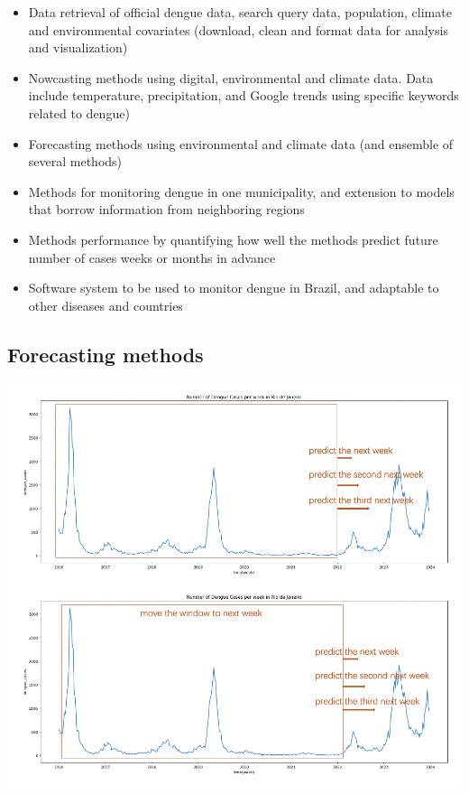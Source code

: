 \documentclass[
  letterpaper,
  DIV=11,
  numbers=noendperiod]{scrreprt}
\providecommand{\tightlist}{%
  \setlength{\itemsep}{0pt}\setlength{\parskip}{0pt}}\usepackage{longtable,booktabs,array}
\begin{document}
\begin{itemize}
\tightlist
\item
  Data retrieval of official dengue data, search query data, population,
  climate and environmental covariates (download, clean and format data
  for analysis and visualization)
\item
  Nowcasting methods using digital, environmental and climate data. Data
  include temperature, precipitation, and Google trends using specific
  keywords related to dengue)
\item
  Forecasting methods using environmental and climate data (and ensemble
  of several methods)
\item
  Methods for monitoring dengue in one municipality, and extension to
  models that borrow information from neighboring regions
\item
  Methods performance by quantifying how well the methods predict future
  number of cases weeks or months in advance
\item
  Software system to be used to monitor dengue in Brazil, and adaptable
  to other diseases and countries
\end{itemize}

\hypertarget{forecasting-methods}{%
\subsection*{Forecasting methods}\label{forecasting-methods}}

\includegraphics[width=6.25in,height=\textheight]{img/denguebrazil-forecasts-movewindow.png}
\end{document}
